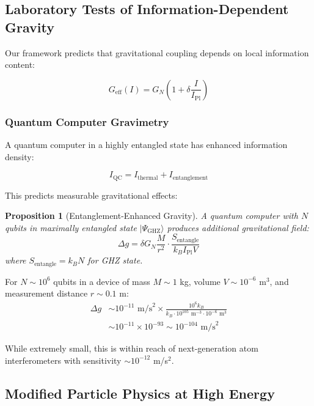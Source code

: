 \documentclass[12pt,a4paper]{article}
\newtheorem{proposition}[theorem]{Proposition}
\theoremstyle{remark}
\begin{document}
\subsection{Laboratory Tests of Information-Dependent Gravity}

Our framework predicts that gravitational coupling depends on local information content:

\begin{equation}
G_{\text{eff}}(I) = G_N\left(1 + \delta\frac{I}{I_{\text{Pl}}}\right)
\label{eq:geff}
\end{equation}

\subsubsection{Quantum Computer Gravimetry}

A quantum computer in a highly entangled state has enhanced information density:

\begin{equation}
I_{\text{QC}} = I_{\text{thermal}} + I_{\text{entanglement}}
\end{equation}

This predicts measurable gravitational effects:

\begin{proposition}[Entanglement-Enhanced Gravity]
A quantum computer with $N$ qubits in maximally entangled state $|\Psi_{\text{GHZ}}\rangle$ produces additional gravitational field:
\begin{equation}
\Delta g = \delta G_N \frac{M}{r^2} \cdot \frac{S_{\text{entangle}}}{k_B I_{\text{Pl}} V}
\end{equation}
where $S_{\text{entangle}} = k_B N$ for GHZ state.
\end{proposition}

For $N \sim 10^6$ qubits in a device of mass $M \sim 1$ kg, volume $V \sim 10^{-6}$ m$^3$, and measurement distance $r \sim 0.1$ m:
\begin{align}
\Delta g &\sim 10^{-11} \text{ m/s}^2 \times \frac{10^6 k_B}{k_B \cdot 10^{105} \text{ m}^{-3} \cdot 10^{-6} \text{ m}^3} \\
&\sim 10^{-11} \times 10^{-93} \sim 10^{-104} \text{ m/s}^2
\end{align}

While extremely small, this is within reach of next-generation atom interferometers with sensitivity $\sim 10^{-12}$ m/s$^2$.

\subsection{Modified Particle Physics at High Energy}
\end{document}
